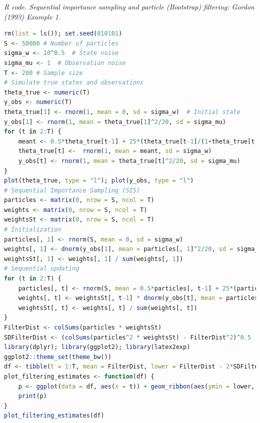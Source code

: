 \begin{enumerate}[leftmargin=*]
\begin{tcolorbox}[enhanced,width=4.67in,center upper,
	fontupper=\large\bfseries,drop shadow southwest,sharp corners]
	\textit{R code. Sequential importance sampling and particle (Bootstrap) filtering: Gordon (1993) Example 1.}
	\begin{VF}
		\begin{lstlisting}[language=R]
rm(list = ls()); set.seed(010101)
S <- 50000 # Number of particles
sigma_w <- 10^0.5  # State noise
sigma_mu <- 1  # Observation noise
T <- 200 # Sample size
# Simulate true states and observations
theta_true <- numeric(T)
y_obs <- numeric(T)
theta_true[1] <- rnorm(1, mean = 0, sd = sigma_w)  # Initial state
y_obs[1] <- rnorm(1, mean = theta_true[1]^2/20, sd = sigma_mu) 
for (t in 2:T) {
	meant <- 0.5*theta_true[t-1] + 25*(theta_true[t-1]/(1+theta_true[t-1]^2)) + 8*cos(1.2*t)
	theta_true[t] <-  rnorm(1, mean = meant, sd = sigma_w)
	y_obs[t] <- rnorm(1, mean = theta_true[t]^2/20, sd = sigma_mu)  
}
plot(theta_true, type = "l"); plot(y_obs, type = "l")
# Sequential Importance Sampling (SIS)
particles <- matrix(0, nrow = S, ncol = T) 
weights <- matrix(0, nrow = S, ncol = T) 
weightsSt <- matrix(0, nrow = S, ncol = T) 
# Initialization
particles[, 1] <- rnorm(S, mean = 0, sd = sigma_w)
weights[, 1] <- dnorm(y_obs[1], mean = particles[, 1]^2/20, sd = sigma_mu)
weightsSt[, 1] <- weights[, 1] / sum(weights[, 1])
# Sequential updating
for (t in 2:T) {
	particles[, t] <- rnorm(S, mean = 0.5*particles[, t-1] + 25*(particles[, t-1]/(1+particles[, t-1]^2)) + 8*cos(1.2*t), sd = sigma_w)  # Compute weights
	weights[, t] <- weightsSt[, t-1] * dnorm(y_obs[t], mean = particles[, t]^2/20, sd = sigma_mu)
	weightsSt[, t] <- weights[, t] / sum(weights[, t])
}
FilterDist <- colSums(particles * weightsSt)
SDFilterDist <- (colSums(particles^2 * weightsSt) - FilterDist^2)^0.5
library(dplyr); library(ggplot2); library(latex2exp)
ggplot2::theme_set(theme_bw())
df <- tibble(t = 1:T, mean = FilterDist, lower = FilterDist - 2*SDFilterDist, upper = FilterDist + 2*SDFilterDist, theta_true = theta_true)
plot_filtering_estimates <- function(df) {
	p <- ggplot(data = df, aes(x = t)) + geom_ribbon(aes(ymin = lower, ymax = upper), alpha = 1, fill = "lightblue") + geom_line(aes(y = theta_true), colour = "black", alpha = 1, linewidth = 0.5) + geom_line(aes(y = mean), colour = "blue", linewidth = 0.5) + ylab(TeX("$\\theta_{t}$")) + xlab("Time")
	print(p)
}
plot_filtering_estimates(df)
\end{lstlisting}
	\end{VF}
\end{tcolorbox} 


\end{enumerate}
